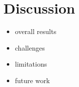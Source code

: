 \section{Discussion}
\begin{itemize}
    \item overall results
    \item challenges
    \item limitations
    \item future work
\end{itemize}